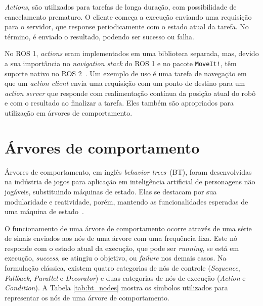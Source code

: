 \documentclass[repeatfields,xlists,xpacks,oneside,yearsonly]{ufrgscca}
\begin{document}
\textit{Actions}, são utilizados para tarefas de longa duração, com possibilidade de
cancelamento prematuro.
O cliente começa a execução enviando uma requisição para o servidor,
que response periodicamente com o estado atual da tarefa.
No término, é enviado o resultado, podendo ser sucesso ou falha.


No ROS 1, \textit{actions} eram implementados em uma biblioteca separada, mas,
devido a sua importância no \textit{navigation stack} do ROS 1 e no pacote
\texttt{MoveIt!}, têm suporte nativo no ROS 2~\cite{actions}.
Um exemplo de uso é uma tarefa de navegação em que um \textit{action client}
envia uma requisição com um ponto de destino para um \textit{action server}
que responde com realimentação contínua da posição atual do robô e
com o resultado ao finalizar a tarefa.
Eles também são apropriados para utilização em árvores de comportamento.

\section{Árvores de comportamento}

Árvores de comportamento, em inglês \textit{behavior trees}~(BT), foram desenvolvidas
na indústria de jogos para aplicação em inteligência artificial de personagens
não jogáveis, substituindo máquinas de estado.
Elas se destacam por sua modularidade e reatividade, porém, mantendo as funcionalidades
esperadas de uma máquina de estado~\cite{BehaviorTree}.

O funcionamento de uma árvore de comportamento ocorre através de uma série de
sinais enviados aos nós de uma árvore com uma frequência fixa.
Este nó responde com o estado atual da execução, que pode ser \textit{running},
se está em execução, \textit{success}, se atingiu o objetivo, ou \textit{failure}
nos demais casos.
Na formulação clássica, existem quatro categorias de nós de controle (\textit{Sequence},
\textit{Fallback}, \textit{Parallel} e \textit{Decorator}) e duas categorias
de nós de execução (\textit{Action} e \textit{Condition}).
A Tabela \ref{tab:bt_nodes} mostra os símbolos utilizados para representar
os nós de uma árvore de comportamento.
\end{document}
